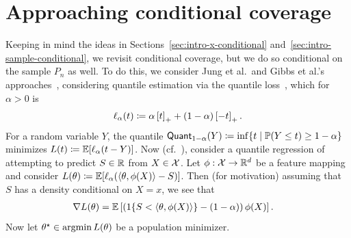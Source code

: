 \documentclass{article}
\newcommand{\loss}{\ell}
\newcommand{\poploss}{L}
\newcommand{\scorerv}{S}
\newcommand{\quant}{\mathsf{Quant}}
\begin{document}
\section{Approaching conditional coverage}
\label{sec:approaching-conditional}

Keeping in mind the ideas in Sections~\ref{sec:intro-x-conditional}
and~\ref{sec:intro-sample-conditional}, we revisit conditional coverage,
but we do so conditional on the sample $P_n$ as well.
%
To do this, we consider Jung et al.\ and Gibbs et al.'s
approaches~\citep{JungNoRaRo23,GibbsChCa23}, considering
quantile estimation via the quantile loss~\citep{KoenkerBa78},
which for $\alpha > 0$ is
\begin{equation*}
  \loss_\alpha(t) \defeq \alpha \hinge{t} + (1 - \alpha) \hinge{-t}.
\end{equation*}
For a random variable $Y$, the quantile $\quant_{1 -
  \alpha}(Y) \defeq \inf\{t \mid \P(Y \le t) \ge 1 - \alpha\}$ minimizes
$\poploss(t) \defeq \E[\loss_\alpha(t - Y)]$.
%
%
Now (cf.~\cite{GibbsChCa23, JungNoRaRo23}), consider a
quantile regression of attempting to predict $\scorerv \in \R$ from $X \in
\mathcal{X}$.
%
Let $\phi : \mathcal{X} \to \mathbb{R}^d$ be a feature mapping and consider
$\poploss(\theta) \defeq \E[\loss_\alpha(\<\theta, \phi(X)\>
  - \scorerv)]$.
%
Then (for motivation) assuming that $\scorerv$ has a density
conditional on $X = x$, we see that
\begin{align*}
  \nabla \poploss(\theta)
  & = \E\left[\left(\indic{\scorerv < \<\theta, \phi(X)\>} - (1 - \alpha)\right)
    \phi(X) \right].
\end{align*}
Now let $\theta\opt \in \argmin \poploss(\theta)$ be a population minimizer.
\end{document}
